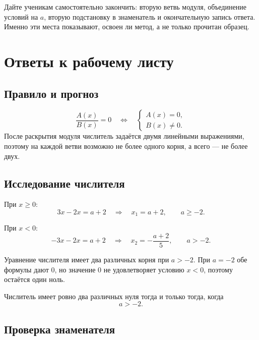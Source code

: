 \begin{teacherbox}
  Дайте ученикам самостоятельно закончить: вторую ветвь модуля, объединение
  условий на \(a\), вторую подстановку в знаменатель и окончательную запись
  ответа. Именно эти места показывают, освоен ли метод, а не только прочитан
  образец.
\end{teacherbox}

\section{Ответы к рабочему листу}

\subsection{Правило и прогноз}

\begin{propertybox}
  \[
    \frac{A(x)}{B(x)}=0
    \quad\Longleftrightarrow\quad
    \begin{cases}
      A(x)=0,\\
      B(x)\ne0.
    \end{cases}
  \]
  После раскрытия модуля числитель задаётся двумя линейными выражениями,
  поэтому на каждой ветви возможно не более одного корня, а всего --- не
  более двух.
\end{propertybox}

\subsection{Исследование числителя}

При \(x\ge0\):
\[
  3x-2x=a+2
  \quad\Longrightarrow\quad
  x_1=a+2,
  \qquad a\ge-2.
\]

При \(x<0\):
\[
  -3x-2x=a+2
  \quad\Longrightarrow\quad
  x_2=-\frac{a+2}{5},
  \qquad a>-2.
\]

Уравнение числителя имеет два различных корня при \(a>-2\). При \(a=-2\) обе
формулы дают \(0\), но значение \(0\) не удовлетворяет условию \(x<0\),
поэтому остаётся один ноль.

\begin{conclusionbox}
  Числитель имеет ровно два различных нуля тогда и только тогда, когда
  \[
    a>-2.
  \]
\end{conclusionbox}

\subsection{Проверка знаменателя}

